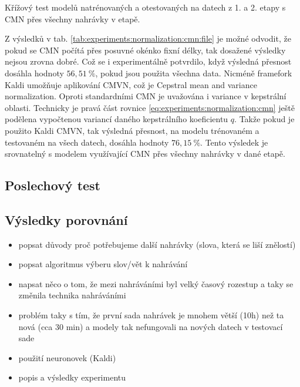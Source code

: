 \begin{table}[htpb]
  \centering
  \def\arraystretch{1.5}
  \caption{Křížový test modelů natrénovaných a otestovaných na datech z 1. a 2. etapy s CMN přes všechny nahrávky v etapě.}
  \label{tab:experiments:normalization:cmn:full}
\end{table}

Z výsledků v tab. \ref{tab:experiments:normalization:cmn:file} je možné odvodit, že pokud se CMN počítá přes posuvné okénko fixní délky, tak dosažené výsledky nejsou zrovna dobré. Což se i experimentálně potvrdilo, když výsledná přesnost dosáhla hodnoty $56,51\ \%$, pokud jsou použita všechna data. Nicméně framefork Kaldi umožňuje aplikování CMVN, což je Cepstral mean and variance normalization. Oproti standardními CMN je uvažována i variance v kepstrální oblasti. Technicky je pravá část rovnice \ref{eq:experiments:normalization:cmn} ještě podělena vypočtenou variancí daného kepstrálního koeficientu $q$. Takže pokud je použito Kaldi CMVN, tak výsledná přesnost, na modelu trénovaném a testovaném na všech datech, dosáhla hodnoty $76,15\ \%$. Tento výsledek je srovnatelný s modelem využívající CMN přes všechny nahrávky v dané etapě.

\subsection{Poslechový test}

\subsection{Výsledky porovnání}

\begin{itemize}
  \item popsat důvody proč potřebujeme další nahrávky (slova, která se liší znělostí)
  \item popsat algoritmus výberu slov/vět k nahrávání
  \item napsat něco o tom, že mezi nahráváními byl velký časový rozestup a taky se změnila technika nahráváními
  \item problém taky s tím, že první sada nahrávek je mnohem větší (10h) než ta nová (cca 30 min) a modely tak nefungovali na nových datech v testovací sade
  \item použití neuronovek (Kaldi)
  \item popis a výsledky experimentu 
\end{itemize}
